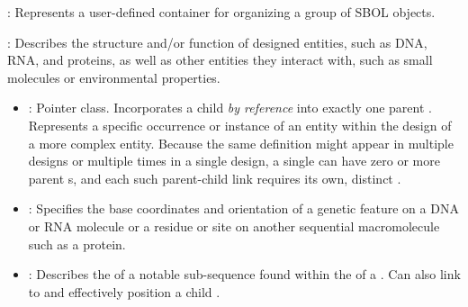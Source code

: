 \begin{description}

\item \emph{}:
Represents a user-defined container for organizing a group of SBOL objects.

\item \emph{}: Describes the structure and/or function of designed entities, such as DNA, RNA, and proteins, as well as other entities they interact with, such as small molecules or environmental properties.

\begin{itemize}
\item \emph{}:
Pointer class. Incorporates a child  \textit{by reference} into exactly one parent . Represents a specific occurrence or instance of an entity within the design of a more complex entity. Because the same definition might appear in  multiple designs or multiple times in a single design, a single  can have zero or more parent s, and each such parent-child link requires its own, distinct .

\item \emph{}:
Specifies the base coordinates and orientation of a genetic feature on a DNA or RNA molecule or a residue or site on another sequential macromolecule such as a protein.

\item \emph{}:
Describes the  of a notable sub-sequence found within the  of a . Can also link to and effectively position a child .


\end{itemize}
\end{description}
